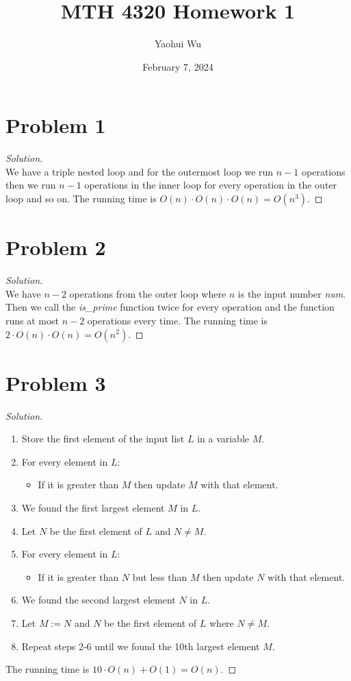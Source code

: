 \documentclass[12pt, letterpaper]{article}
\title{MTH 4320 Homework 1}
\author{Yaohui Wu}
\date{February 7, 2024}
\newenvironment{solution}{\begin{proof}[Solution]\hfill\\}{\end{proof}}
\begin{document}
\maketitle
\tableofcontents
\section{Problem 1}
\begin{solution}
    We have a triple nested loop and for the outermost loop we run \(n-1\) operations
    then we run \(n-1\) operations in the inner loop for every operation in the outer loop
    and so on. The running time is \(O(n)\cdot O(n)\cdot O(n)=O(n^3)\).
\end{solution}

\section{Problem 2}
\begin{solution}
    We have \(n-2\) operations from the outer loop where \(n\) is the input number \textit{num}. Then we call the \textit{is\_prime} function twice for every operation
    and the function runs at most \(n-2\) operations every time. The running time is \(2\cdot O(n)\cdot O(n)=O(n^2)\).
\end{solution}

\section{Problem 3}
\begin{solution}
    \begin{enumerate}
        \item Store the first element of the input list \(L\) in a variable \(M\).
        \item For every element in \(L\):
        \begin{itemize}
            \item If it is greater than \(M\) then update \(M\) with that element.
        \end{itemize}
        \item We found the first largest element \(M\) in \(L\).
        \item Let \(N\) be the first element of \(L\) and \(N\neq M\).
        \item For every element in \(L\):
        \begin{itemize}
            \item If it is greater than \(N\) but less than \(M\) then update \(N\) with that element.
        \end{itemize}
        \item We found the second largest element \(N\) in \(L\).
        \item Let \(M:=N\) and \(N\) be the first element of \(L\) where \(N\neq M\).
        \item Repeat steps 2-6 until we found the 10th largest element \(M\).
    \end{enumerate}
    The running time is \(10\cdot O(n)+O(1)=O(n)\).
\end{solution}
\end{document}
